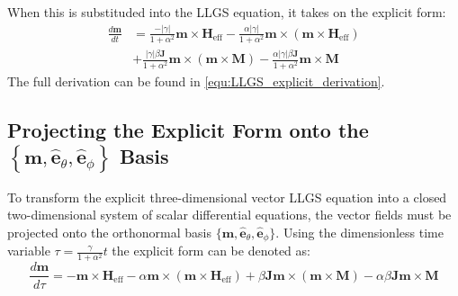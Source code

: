 \documentclass[reprint,amsmath,amssymb,aps, floatfix]{revtex4-2}
\begin{document}
When this is substituded into the LLGS equation, it takes on the explicit form:
\begin{equation}
    \begin{aligned}
        \frac{d\mathbf{m}}{dt} & = \frac{-\left|\gamma\right|}{1+\alpha^2}\mathbf{m}\times\mathbf{H}_{\text{eff}} - \frac{\alpha\left|\gamma\right|}{1+\alpha^2}\mathbf{m}\times\left(\mathbf{m}\times\mathbf{H}_{\text{eff}}\right) \\[1ex]
        & + \frac{\left|\gamma\right|\beta\mathbf{J}}{1+\alpha^2}\mathbf{m}\times\left(\mathbf{m}\times\mathbf{M}\right) - \frac{\alpha\left|\gamma\right|\beta\mathbf{J}}{1+\alpha^2}\mathbf{m}\times\mathbf{M}
    \end{aligned}
\end{equation}
The full derivation can be found in \autoref{equ:LLGS_explicit_derivation}.

\subsection{Projecting the Explicit Form onto the $\left\{\mathbf{m}, \hat{\mathbf{e}}_{\theta}, \hat{\mathbf{e}}_{\phi}\right\}$ Basis}
To transform the explicit three-dimensional vector LLGS equation into a closed two-dimensional system of scalar differential equations, the vector fields must be projected onto the orthonormal basis $\{\mathbf{m}, \hat{\mathbf{e}}_{\theta}, \hat{\mathbf{e}}_{\phi}\}$.
Using the dimensionless time variable $\tau=\frac{\gamma}{1+\alpha^2}t$ the explicit form can be denoted as:
\begin{equation}
    \frac{d \mathbf{m}}{d \tau} = - \mathbf{m}\times\mathbf{H}_{\text{eff}} - \alpha\mathbf{m}\times\left(\mathbf{m}\times\mathbf{H}_{\text{eff}}\right)+\beta\mathbf{J}\mathbf{m}\times\left(\mathbf{m}\times\mathbf{M}\right)-\alpha\beta\mathbf{J}\mathbf{m}\times\mathbf{M}
\end{equation}
\end{document}
